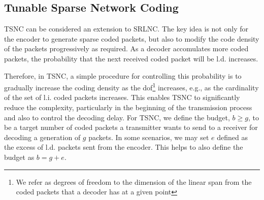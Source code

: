

%

\subsection{Tunable Sparse Network Coding}

\ac{TSNC} can be considered an extension to \ac{SRLNC}. The key idea is
not only for the encoder to generate sparse coded packets, but also to
modify the code density of the packets progressively as required. As a
decoder accomulates more coded packets, the probability that the next
received coded packet will be \ac{l.d.} increases.

Therefore, in \ac{TSNC}, a simple procedure for controlling this probability
is to gradually increase the coding density as the \ac{dof}\footnote{We refer
as degrees of freedom to the dimension of the linear span from the coded
packets that a decoder has at a given point} increases, e.g., as the
cardinality of the set of \ac{l.i.} coded packets increases. This enables
\ac{TSNC} to significantly reduce the complexity, particularly in the
beginning of the transmission process and also to control the decoding
delay. For \ac{TSNC}, we define the budget, $b \geq g$, to be a target
number of coded packets a transmitter wants to send to a receiver
for decoding a generation of $g$ packets. In some scenarios, we may set
$e$ defined as the excess of \ac{l.d.} packets sent from the encoder.
This helps to also define the budget as $b = g + e$.

